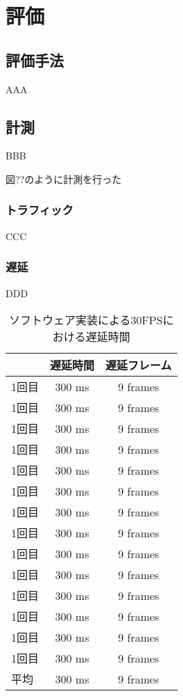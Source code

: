 \chapter{評価}
\label{chap:evaluation}

\section{評価手法}

AAA

\section{計測}

BBB

図??のように計測を行った

\subsection{トラフィック}

CCC

\subsection{遅延}

DDD

\begin{table}[htbp]
  \caption{ソフトウェア実装による30FPSにおける遅延時間}
  \label{tb:pg235-vin-axi4-stream}
  \begin{center}
  \begin{tabular}{l|c|c}
    \hline
         & 遅延時間  & 遅延フレーム \\\hline\hline
    1回目 & 300 ms  & 9 frames \\\hline
    1回目 & 300 ms  & 9 frames \\\hline
    1回目 & 300 ms  & 9 frames \\\hline
    1回目 & 300 ms  & 9 frames \\\hline
    1回目 & 300 ms  & 9 frames \\\hline
    1回目 & 300 ms  & 9 frames \\\hline
    1回目 & 300 ms  & 9 frames \\\hline
    1回目 & 300 ms  & 9 frames \\\hline
    1回目 & 300 ms  & 9 frames \\\hline
    1回目 & 300 ms  & 9 frames \\\hline
    1回目 & 300 ms  & 9 frames \\\hline
    1回目 & 300 ms  & 9 frames \\\hline
    1回目 & 300 ms  & 9 frames \\\hline
    1回目 & 300 ms  & 9 frames \\\hline\hline
    平均  & 300 ms  & 9 frames \\\hline
  \end{tabular}\end{center}
\end{table}


